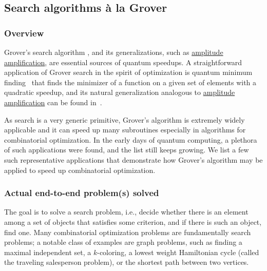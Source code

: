 \begin{refsection}

	\subsection{Search algorithms \`{a} la Grover}\label{appl:SearchAlgorithms}
	\newcommand{\SAT}{\mathsf{SAT}}
    \newcommand{\QUBO}{\mathsf{QUBO}}
    \newcommand{\MAXCUT}{$\mathsf{MAX}$-$\mathsf{CUT}$}

	\subsubsection*{Overview}
	Grover's search algorithm \cite{grover1996QSearch}, and its generalizations, such as \hyperref[prim:AmpAmp]{amplitude amplification}, are essential sources of quantum speedups. 	
	A straightforward application of Grover search in the spirit of optimization is quantum minimum finding~\cite{durr1996QMinimumFinding} that finds the minimizer of a function on a given set of elements with a quadratic speedup, and its natural generalization analogous to \hyperref[prim:AmpAmp]{amplitude amplification} can be found in~\cite{apeldoorn2017QSDPSolvers}.
	
	As search is a very generic primitive, Grover's algorithm is extremely widely applicable and it can speed up many subroutines especially in algorithms for combinatorial optimization. 
	In the early days of quantum computing, a plethora of such applications were found, and the list still keeps growing. 
	We list a few such representative applications that demonstrate how Grover's algorithm may be applied to speed up combinatorial optimization.
	
	
	
	\subsubsection*{Actual end-to-end problem(s) solved}
	The goal is to solve a search problem, i.e., decide whether there is an element among a set of objects that satisfies some criterion, and if there is such an object, find one. 
	Many combinatorial optimization problems are fundamentally search problems; a notable class of examples are graph problems, such as finding a maximal independent set, a $k$-coloring, a lowest weight Hamiltonian cycle (called the traveling salesperson problem), or the shortest path between two vertices.
	

\end{refsection}
